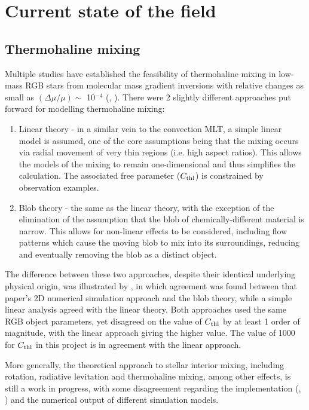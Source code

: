 \documentclass[12pt, a4paper]{report}
\begin{document}
\chapter{Current state of the field}
\section{Thermohaline mixing}
Multiple studies have established the feasibility of thermohaline mixing in low-mass RGB stars from molecular mass gradient inversions with relative changes as small as $(\Delta\mu / \mu) \sim$ 10$^{-4}$ (\cite{2006Sci...314.1580E}, \cite{2010ApJ...723..563D}). There were 2 slightly different approaches put forward for modelling thermohaline mixing:
\begin{enumerate}

\item Linear theory \citep{1972ApJ...172..165U} - in a similar vein to the convection MLT, a simple linear model is assumed, one of the core assumptions being that the mixing occurs via radial movement of very thin regions (i.e. high aspect ratios). This allows the models of the mixing to remain one-dimensional and thus simplifies the calculation. The associated free parameter ($C_{\textnormal{thl}}$) is constrained by observation examples.
\item Blob theory \citep{1980A&A....91..175K} - the same as the linear theory, with the exception of the elimination of the assumption that the blob of chemically-different material is narrow. This allows for non-linear effects to be considered, including flow patterns which cause the moving blob to mix into its surroundings, reducing and eventually removing the blob as a distinct object.
\end{enumerate}

The difference between these two approaches, despite their identical underlying physical origin, was illustrated by \cite{2010ApJ...723..563D}, in which agreement was found between that paper's 2D numerical simulation approach and the blob theory, while a simple linear analysis agreed with the linear theory. Both approaches used the same RGB object parameters, yet disagreed on the value of $C_{\textnormal{thl}}$ by at least 1 order of magnitude, with the linear approach giving the higher value. The value of 1000 for $C_{\textnormal{thl}}$ in this project is in agreement with the linear approach.

More generally, the theoretical approach to stellar interior mixing, including rotation, radiative levitation and thermohaline mixing, among other effects, is still a work in progress, with some disagreement regarding the implementation (\cite{2010ApJ...723..563D}, \cite{2013A&A...553A...1M}) and the numerical output \citep{2015MNRAS.446.2673L} of different simulation models.
\end{document}

